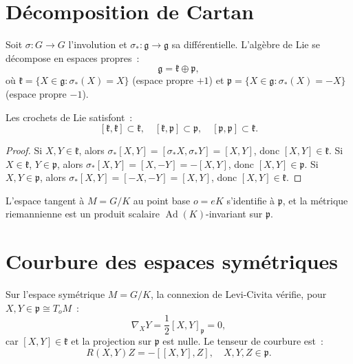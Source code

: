 \section{D\'ecomposition de Cartan}

\begin{definition}
Soit $\sigma : G \to G$ l'involution et $\sigma_* : \mathfrak{g} \to \mathfrak{g}$
sa diff\'erentielle. L'alg\`ebre de Lie se d\'ecompose en espaces propres~:
\[
    \mathfrak{g} = \mathfrak{k} \oplus \mathfrak{p},
\]
o\`u $\mathfrak{k} = \{X \in \mathfrak{g} : \sigma_*(X) = X\}$ (espace propre $+1$)
et $\mathfrak{p} = \{X \in \mathfrak{g} : \sigma_*(X) = -X\}$ (espace propre $-1$).
\end{definition}

\begin{proposition}
Les crochets de Lie satisfont~:
\[
    [\mathfrak{k}, \mathfrak{k}] \subset \mathfrak{k}, \quad
    [\mathfrak{k}, \mathfrak{p}] \subset \mathfrak{p}, \quad
    [\mathfrak{p}, \mathfrak{p}] \subset \mathfrak{k}.
\]
\end{proposition}

\begin{proof}
Si $X, Y \in \mathfrak{k}$, alors $\sigma_*[X,Y] = [\sigma_*X, \sigma_*Y] = [X,Y]$,
donc $[X,Y] \in \mathfrak{k}$. Si $X \in \mathfrak{k}$, $Y \in \mathfrak{p}$,
alors $\sigma_*[X,Y] = [X,-Y] = -[X,Y]$, donc $[X,Y] \in \mathfrak{p}$.
Si $X, Y \in \mathfrak{p}$, alors $\sigma_*[X,Y] = [-X,-Y] = [X,Y]$,
donc $[X,Y] \in \mathfrak{k}$.
\end{proof}

L'espace tangent \`a $M = G/K$ au point base $o = eK$ s'identifie \`a $\mathfrak{p}$,
et la m\'etrique riemannienne est un produit scalaire $\operatorname{Ad}(K)$-invariant
sur $\mathfrak{p}$.

\section{Courbure des espaces sym\'etriques}

\begin{theoreme}
Sur l'espace sym\'etrique $M = G/K$, la connexion de Levi-Civita v\'erifie, pour
$X, Y \in \mathfrak{p} \cong T_oM$~:
\[
    \nabla_X Y = \frac{1}{2}[X, Y]_\mathfrak{p} = 0,
\]
car $[X, Y] \in \mathfrak{k}$ et la projection sur $\mathfrak{p}$ est nulle.
Le tenseur de courbure est~:
\[
    R(X, Y)Z = -[[X, Y], Z], \quad X, Y, Z \in \mathfrak{p}.
\]
\end{theoreme}

